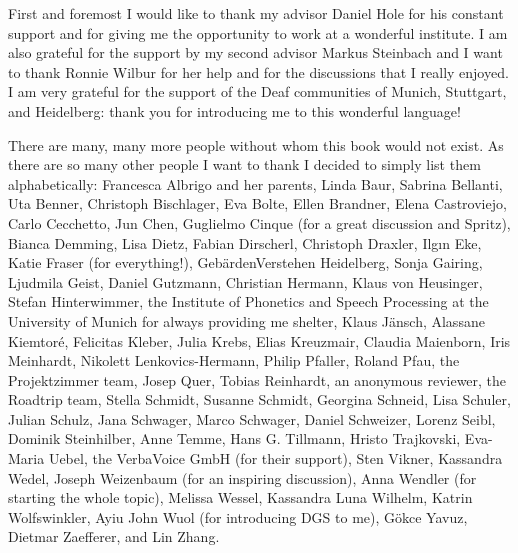 
First and foremost I would like to thank my advisor Daniel Hole for his constant support and for giving me the opportunity to work at a wonderful institute. I am also grateful for the support by my second advisor Markus Steinbach and I want to thank Ronnie Wilbur for her help and for the discussions that I really enjoyed. I am very grateful for the support of the Deaf communities of Munich, Stuttgart, and Heidelberg: thank you for introducing me to this wonderful language! 

There are many, many more people without whom this book would not exist. As there are so many other people I want to thank I decided to simply list them alphabetically: Francesca Albrigo and her parents, Linda Baur, Sabrina Bellanti, Uta Benner, Christoph Bischlager, Eva Bolte, Ellen Brandner, Elena Castroviejo, Carlo Cecchetto, Jun Chen, Guglielmo Cinque (for a great discussion and Spritz), Bianca Demming, Lisa Dietz, Fabian Dirscherl, Christoph Draxler, Ilg\i n Eke, Katie Fraser (for everything!), Geb\"ardenVerstehen Heidelberg, Sonja Gairing, Ljudmila Geist, Daniel Gutzmann, Christian Hermann, Klaus von Heusinger, Stefan Hinterwimmer, the Institute of Phonetics and Speech Processing at the University of Munich for always providing me shelter, Klaus J\"ansch, Alassane Kiemtor\'{e}, Felicitas Kleber, Julia Krebs, Elias Kreuzmair, Claudia Maienborn, Iris Meinhardt, Nikolett Lenkovics-Hermann, Philip Pfaller, Roland Pfau, the Projektzimmer team, Josep Quer, Tobias Reinhardt, an anonymous reviewer, the Roadtrip team, Stella Schmidt, Susanne Schmidt, Georgina Schneid, Lisa Schuler, Julian Schulz, Jana Schwager, Marco Schwager, Daniel Schweizer, Lorenz Seibl, Dominik Steinhilber, Anne Temme, Hans G. Tillmann, Hristo Trajkovski, Eva-Maria Uebel, the VerbaVoice GmbH (for their support), Sten Vikner, Kassandra Wedel, Joseph Weizenbaum (for an inspiring discussion), Anna Wendler (for starting the whole topic), Melissa Wessel, Kassandra Luna Wilhelm, Katrin Wolfswinkler, Ayiu John Wuol (for introducing DGS to me), G\"okce Yavuz, Dietmar Zaefferer, and Lin Zhang.



